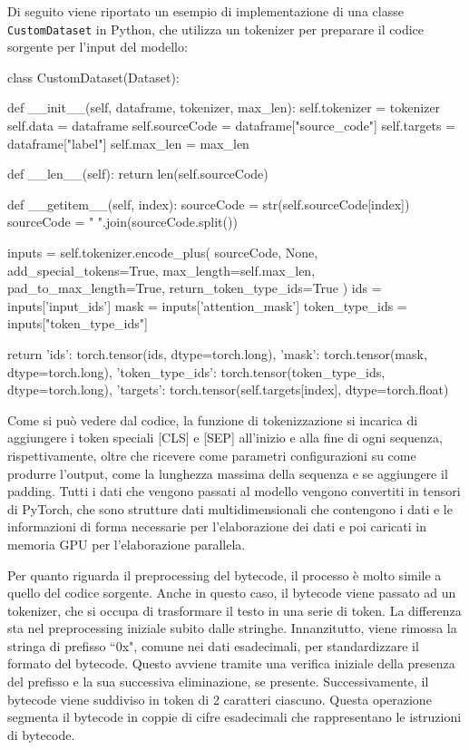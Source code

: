 \documentclass[../../Thesis.tex]{subfiles}
\begin{document}
Di seguito viene riportato un esempio di implementazione di una classe \texttt{CustomDataset} in Python, che utilizza un tokenizer per preparare il codice sorgente per l'input del modello:

\begin{python}
class CustomDataset(Dataset):

    def __init__(self, dataframe, tokenizer, max_len):
        self.tokenizer = tokenizer
        self.data = dataframe
        self.sourceCode = dataframe["source_code"]
        self.targets = dataframe["label"]
        self.max_len = max_len

    def __len__(self):
        return len(self.sourceCode)

    def __getitem__(self, index):
        sourceCode = str(self.sourceCode[index])
        sourceCode = " ".join(sourceCode.split())

        inputs = self.tokenizer.encode_plus(
            sourceCode,
            None,
            add_special_tokens=True,
            max_length=self.max_len,
            pad_to_max_length=True,
            return_token_type_ids=True
        )
        ids = inputs['input_ids']
        mask = inputs['attention_mask']
        token_type_ids = inputs["token_type_ids"]

        return {
            'ids': torch.tensor(ids, dtype=torch.long),
            'mask': torch.tensor(mask, dtype=torch.long),
            'token_type_ids': torch.tensor(token_type_ids, dtype=torch.long),
            'targets': torch.tensor(self.targets[index], dtype=torch.float)
        }
\end{python}

Come si pu\`o vedere dal codice, la funzione di tokenizzazione si incarica di aggiungere i token speciali [CLS] e [SEP] all'inizio e alla fine di ogni sequenza, rispettivamente, oltre che ricevere come parametri configurazioni su come produrre l'output, come la lunghezza massima della sequenza e se aggiungere il padding. Tutti i dati che vengono passati al modello vengono convertiti in tensori di PyTorch, che sono strutture dati multidimensionali che contengono i dati e le informazioni di forma necessarie per l'elaborazione dei dati e poi caricati in memoria GPU per l'elaborazione parallela.

Per quanto riguarda il preprocessing del bytecode, il processo \`e molto simile a quello del codice sorgente. Anche in questo caso, il bytecode viene passato ad un tokenizer, che si occupa di trasformare il testo in una serie di token. La differenza sta nel preprocessing iniziale subito dalle stringhe. Innanzitutto, viene rimossa la stringa di prefisso ``0x", comune nei dati esadecimali, per standardizzare il formato del bytecode. Questo avviene tramite una verifica iniziale della presenza del prefisso e la sua successiva eliminazione, se presente. Successivamente, il bytecode viene suddiviso in token di 2 caratteri ciascuno. Questa operazione segmenta il bytecode in coppie di cifre esadecimali che rappresentano le istruzioni di bytecode.
\end{document}
